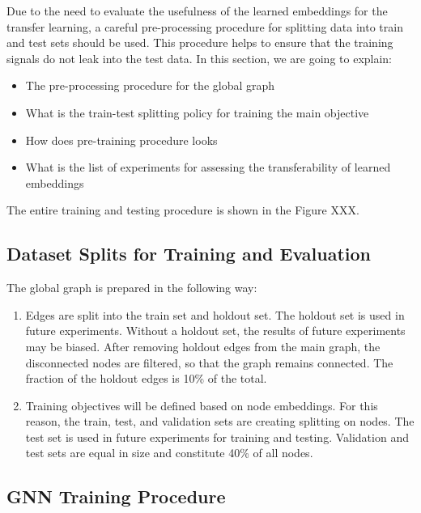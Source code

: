 \documentclass[a4paper,twoside]{article}
\begin{document}
Due to the need to evaluate the usefulness of the learned embeddings for the transfer learning, a careful pre-processing procedure for splitting data into train and test sets should be used. This procedure helps to ensure that the training signals do not leak into the test data. In this section, we are going to explain:
\begin{itemize}
    \item The pre-processing procedure for the global graph
    \item What is the train-test splitting policy for training the main objective
    \item How does pre-training procedure looks
    \item What is the list of experiments for assessing the transferability of learned embeddings
\end{itemize}

The entire training and testing procedure is shown in the Figure XXX.

\subsection{Dataset Splits for Training and Evaluation}

The global graph is prepared in the following way:
\begin{enumerate}
    \item Edges are split into the train set and holdout set. The holdout set is used in future experiments. Without a holdout set, the results of future experiments may be biased. After removing holdout edges from the main graph, the disconnected nodes are filtered, so that the graph remains connected. The fraction of the holdout edges is 10\% of the total.
    \item Training objectives will be defined based on node embeddings. For this reason, the train, test, and validation sets are creating splitting on nodes. The test set is used in future experiments for training and testing. Validation and test sets are equal in size and constitute 40\% of all nodes.
\end{enumerate}

\subsection{GNN Training Procedure}
\end{document}
